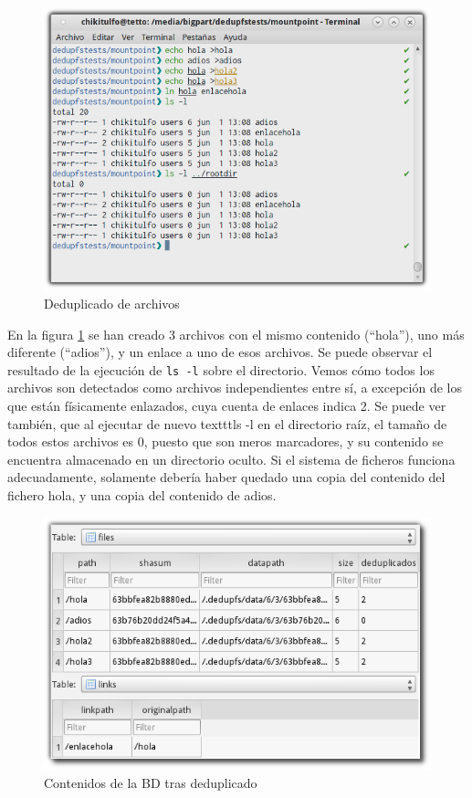\documentclass[12pt,a4paper]{article}
\begin{document}
\begin{figure}[h!]
  \centering
  \label{fig:test1}
  \includegraphics[width=.9\linewidth]{imagenes/test1}
  \caption{Deduplicado de archivos}
\end{figure}

En la figura \ref{fig:test1} se han creado 3 archivos con el mismo contenido (``hola''), uno más diferente (``adios''), y un enlace a uno de esos archivos. Se puede observar el resultado de la ejecución de \texttt{\small ls -l} sobre el directorio. Vemos cómo todos los archivos son detectados como archivos independientes entre sí, a excepción de los que están físicamente enlazados, cuya cuenta de enlaces indica 2. Se puede ver también, que al ejecutar de nuevo texttt{\small ls -l} en el directorio raíz, el tamaño de todos estos archivos es 0, puesto que son meros marcadores, y su contenido se encuentra almacenado en un directorio oculto. Si el sistema de ficheros funciona adecuadamente, solamente debería haber quedado una copia del contenido del fichero hola, y una copia del contenido de adios.

\begin{figure}[h!]
  \centering
  \label{fig:db1}
  \includegraphics[width=.75\linewidth]{imagenes/db1}
  \caption{Contenidos de la BD tras deduplicado}
\end{figure}
\end{document}
